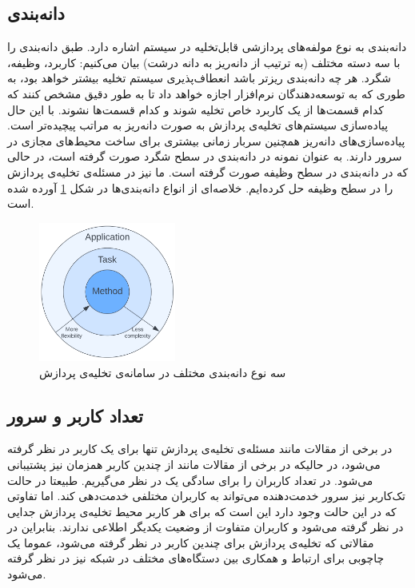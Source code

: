 \subsection{دانه‌بندی}
دانه‌بندی به نوع مولفه‌های پردازشی قابل‌تخلیه در سیستم اشاره دارد. طبق \cite{wang2019} دانه‌بندی را با سه دسته مختلف (به ترتیب از دانه‌‌ریز به دانه ‌درشت) بیان می‌کنیم: کاربرد، وظیفه، شگرد. هر چه دانه‌بندی ریزتر باشد انعطاف‌پذیری سیستم تخلیه بیشتر خواهد بود، به طوری که به توسعه‌دهندگان نرم‌افزار اجازه خواهد داد تا به طور دقیق مشخص کنند که کدام قسمت‌ها از یک کاربرد خاص تخلیه شوند و کدام قسمت‌ها نشوند. با این حال پیاده‌سازی سیستم‌های تخلیه‌ی پردازش به صورت دانه‌ریز به مراتب پیچیده‌تر است. پیاده‌سازی‌های دانه‌ریز همچنین سربار زمانی بیشتری برای ساخت محیط‌های مجازی در سرور دارند. به عنوان نمونه در \cite{maui} دانه‌بندی در سطح شگرد صورت گرفته است، در حالی که در \cite{Liu} دانه‌بندی در سطح وظیفه صورت گرفته است. ما نیز در \CurrentProject مسئله‌ی تخلیه‌ی پردازش را در سطح وظیفه حل کرده‌ایم. خلاصه‌ای از انواع دانه‌بندی‌ها در شکل \ref{fig:granularity} آورده شده است.
\begin{figure}[H]
	\centering
	\includegraphics[width=0.4\textwidth]{figures/granularity.png}
	\caption{سه نوع دانه‌بندی مختلف در سامانه‌ی تخلیه‌ی پردازش}
	\label{fig:granularity}
\end{figure}

\subsection{تعداد کاربر و سرور}
در برخی از مقالات مانند \cite{Liu} مسئله‌ی تخلیه‌ی پردازش تنها برای یک کاربر در نظر گرفته می‌شود، در حالیکه در برخی از مقالات مانند \cite{multiuser} از چندین کاربر همزمان نیز پشتیبانی می‌شود. در \CurrentProject تعداد کاربران را برای سادگی یک در نظر می‌گیریم. طبیعتا در حالت تک‌کاربر نیز سرور خدمت‌دهنده می‌تواند به کاربران مختلفی خدمت‌دهی کند. اما تفاوتی که در این حالت وجود دارد این است که برای هر کاربر محیط تخلیه‌ی پردازش جدایی در نظر گرفته می‌شود و کاربران متفاوت از وضعیت یکدیگر اطلاعی ندارند. بنابراین در مقالاتی که تخلیه‌ی پردازش برای چندین کاربر در نظر گرفته می‌شود، عموما یک چاچوبی برای ارتباط و همکاری بین دستگاه‌های مختلف در شبکه نیز در نظر گرفته می‌شود. \\

